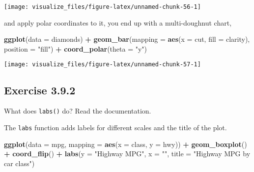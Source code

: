 \documentclass[]{book}
\newenvironment{Shaded}{\begin{snugshade}}{\end{snugshade}}
\newcommand{\DataTypeTok}[1]{\textcolor[rgb]{0.13,0.29,0.53}{#1}}
\newcommand{\KeywordTok}[1]{\textcolor[rgb]{0.13,0.29,0.53}{\textbf{#1}}}
\newcommand{\NormalTok}[1]{#1}
\newcommand{\OperatorTok}[1]{\textcolor[rgb]{0.81,0.36,0.00}{\textbf{#1}}}
\newcommand{\StringTok}[1]{\textcolor[rgb]{0.31,0.60,0.02}{#1}}
\theoremstyle{plain}
\theoremstyle{remark}
\begin{document}
\begin{center}\texttt{[image: visualize\_files/figure-latex/unnamed-chunk-56-1]} \end{center}

and apply polar coordinates to it, you end up with a multi-doughnut
chart,

\begin{Shaded}
\begin{Highlighting}[]
\KeywordTok{ggplot}\NormalTok{(}\DataTypeTok{data =}\NormalTok{ diamonds) }\OperatorTok{+}
\StringTok{  }\KeywordTok{geom_bar}\NormalTok{(}\DataTypeTok{mapping =} \KeywordTok{aes}\NormalTok{(}\DataTypeTok{x =}\NormalTok{ cut, }\DataTypeTok{fill =}\NormalTok{ clarity), }\DataTypeTok{position =} \StringTok{"fill"}\NormalTok{) }\OperatorTok{+}
\StringTok{  }\KeywordTok{coord_polar}\NormalTok{(}\DataTypeTok{theta =} \StringTok{"y"}\NormalTok{)}
\end{Highlighting}
\end{Shaded}

\begin{center}\texttt{[image: visualize\_files/figure-latex/unnamed-chunk-57-1]} \end{center}

\hypertarget{exercise-3.9.2}{%
\subsection*{\texorpdfstring{Exercise
{3.9.2}}{Exercise 3.9.2}}\label{exercise-3.9.2}}

What does \texttt{labs()} do? Read the documentation.

The \texttt{labs} function adds labels for different scales and the
title of the plot.

\begin{Shaded}
\begin{Highlighting}[]
\KeywordTok{ggplot}\NormalTok{(}\DataTypeTok{data =}\NormalTok{ mpg, }\DataTypeTok{mapping =} \KeywordTok{aes}\NormalTok{(}\DataTypeTok{x =}\NormalTok{ class, }\DataTypeTok{y =}\NormalTok{ hwy)) }\OperatorTok{+}
\StringTok{  }\KeywordTok{geom_boxplot}\NormalTok{() }\OperatorTok{+}
\StringTok{  }\KeywordTok{coord_flip}\NormalTok{() }\OperatorTok{+}
\StringTok{  }\KeywordTok{labs}\NormalTok{(}\DataTypeTok{y =} \StringTok{"Highway MPG"}\NormalTok{, }\DataTypeTok{x =} \StringTok{""}\NormalTok{, }\DataTypeTok{title =} \StringTok{"Highway MPG by car class"}\NormalTok{)}
\end{Highlighting}
\end{Shaded}
\end{document}
